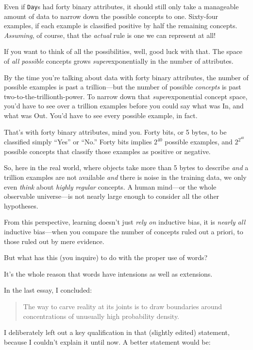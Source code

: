 { Even if \texttt{Day}s had forty binary attributes, it should still only
take a manageable amount of data to narrow down the possible concepts
to one. Sixty-four examples, if each example is classified positive by
half the remaining concepts. \textit{Assuming}, of course, that the
\textit{actual} rule is one we can represent at all!


 If you want to think of all the possibilities, well, good luck
with that. The space of \textit{all possible} concepts grows
\textit{super}exponentially in the number of attributes.


 By the time you're talking about data with forty
binary attributes, the number of possible examples is past a
trillion---but the number of possible \textit{concepts} is past
two-to-the-trillionth-power. To narrow down that
\textit{super}exponential concept space, you'd have to
see over a trillion examples before you could say what was In, and what
was Out. You'd have to see every possible example, in
fact.


 That's with forty binary attributes, mind you.
Forty bits, or 5 bytes, to be classified simply
``Yes'' or
``No.'' Forty bits implies
$2^{40}$ possible examples, and $2^{2^{40}}$
possible concepts that classify those examples as positive or
negative.


 So, here in the real world, where objects take more than 5 bytes
to describe \textit{and} a trillion examples are not available
\textit{and} there is noise in the training data, we only even
\textit{think} about \textit{highly regular} concepts. A human
mind---or the whole observable universe---is not nearly large enough to
consider all the other hypotheses.


 From this perspective, learning doesn't just
\textit{rely on} inductive bias, it is \textit{nearly all} inductive
bias---when you compare the number of concepts ruled out a priori, to
those ruled out by mere evidence.


 But what has this (you inquire) to do with the proper use of
words?


 It's the whole reason that words have intensions
as well as extensions.


 In the last essay, I concluded:

\begin{quote}
 The way to carve reality at its joints is to draw boundaries
 around concentrations of unusually high probability density.
\end{quote}


 I deliberately left out a key qualification in that (slightly
edited) statement, because I couldn't explain it until
now. A better statement would be:

}
